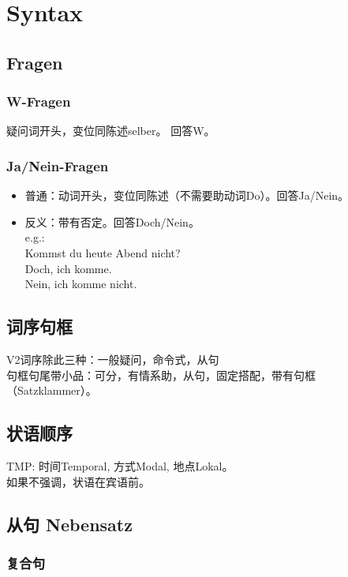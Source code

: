 \chapter{Syntax}
\section{Fragen}
\subsection{W-Fragen}
疑问词开头，变位同陈述selber。
回答W。
\subsection{Ja/Nein-Fragen}
\begin{itemize}
    \item 普通：动词开头，变位同陈述（不需要助动词Do）。回答Ja/Nein。
    \item 反义：带有否定。回答Doch/Nein。 \\
          e.g.: \\
          Kommst du heute Abend nicht? \\
          Doch, ich komme. \\
          Nein, ich komme nicht.
\end{itemize}

\section{词序句框}
V2词序除此三种：一般疑问，命令式，从句 \\
句框句尾带小品：可分，有情系助，从句，固定搭配，带有句框（Satzklammer）。
\label{sub:syntax:klammer}

\section{状语顺序}
\label{sub:syntax:adv:order}
TMP: 时间Temporal, 方式Modal, 地点Lokal。\\
如果不强调，状语在宾语前。 \\

\section{从句 Nebensatz}

\subsection{复合句}

